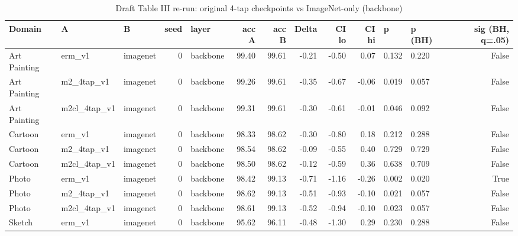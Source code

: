 \begin{table}
\caption{Draft Table III re-run: original 4-tap checkpoints vs ImageNet-only (backbone)}
\label{tab:leak_v1_vs_imagenet}
\begin{tabular}{lllrlrrrrrllr}
\toprule
Domain & A & B & seed & layer & acc A & acc B & Delta & CI lo & CI hi & p & p (BH) & sig (BH, q=.05) \\
\midrule
Art Painting & erm\_v1 & imagenet & 0 & backbone & 99.40 & 99.61 & -0.21 & -0.50 & 0.07 & 0.132 & 0.220 & False \\
Art Painting & m2\_4tap\_v1 & imagenet & 0 & backbone & 99.26 & 99.61 & -0.35 & -0.67 & -0.06 & 0.019 & 0.057 & False \\
Art Painting & m2cl\_4tap\_v1 & imagenet & 0 & backbone & 99.31 & 99.61 & -0.30 & -0.61 & -0.01 & 0.046 & 0.092 & False \\
Cartoon & erm\_v1 & imagenet & 0 & backbone & 98.33 & 98.62 & -0.30 & -0.80 & 0.18 & 0.212 & 0.288 & False \\
Cartoon & m2\_4tap\_v1 & imagenet & 0 & backbone & 98.54 & 98.62 & -0.09 & -0.55 & 0.40 & 0.729 & 0.729 & False \\
Cartoon & m2cl\_4tap\_v1 & imagenet & 0 & backbone & 98.50 & 98.62 & -0.12 & -0.59 & 0.36 & 0.638 & 0.709 & False \\
Photo & erm\_v1 & imagenet & 0 & backbone & 98.42 & 99.13 & -0.71 & -1.16 & -0.26 & 0.002 & 0.020 & True \\
Photo & m2\_4tap\_v1 & imagenet & 0 & backbone & 98.62 & 99.13 & -0.51 & -0.93 & -0.10 & 0.021 & 0.057 & False \\
Photo & m2cl\_4tap\_v1 & imagenet & 0 & backbone & 98.61 & 99.13 & -0.52 & -0.94 & -0.10 & 0.023 & 0.057 & False \\
Sketch & erm\_v1 & imagenet & 0 & backbone & 95.62 & 96.11 & -0.48 & -1.30 & 0.29 & 0.230 & 0.288 & False \\
\bottomrule
\end{tabular}
\end{table}
